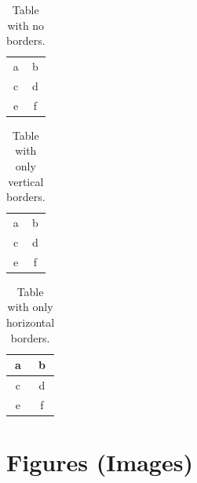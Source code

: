 \documentclass[12pt, a4paper]{book}
\begin{document}
\begin{table}[h!]
    \centering
    \begin{tabular}{cc}
        a & b \\
        c & d \\
        e & f \\
    \end{tabular}
    \caption{Table with no borders.}
\end{table}

\vspace{12pt}

\begin{table}[h!]
    \centering
    \begin{tabular}{|c|c|}
        a & b \\
        c & d \\
        e & f \\
    \end{tabular}
    \caption{Table with only vertical borders.}
\end{table}

\vspace{12pt}

\begin{table}[h!]
    \centering
    \begin{tabular}{cc} \hline
        a & b \\ \hline
        c & d \\ \hline
        e & f \\ \hline
    \end{tabular}
    \caption{Table with only horizontal borders.}
\end{table}

\clearpage
\section{Figures (Images)}
\end{document}
